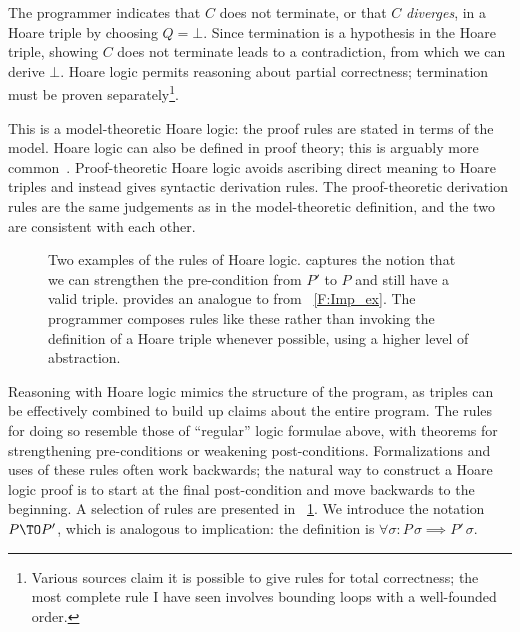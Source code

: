 The programmer indicates that \(C\) does not terminate, or that \(C\)
\emph{diverges}, in a Hoare triple by choosing \(Q = \bot\). Since termination
is a hypothesis in the Hoare triple, showing \(C\) does not terminate leads to a
contradiction, from which we can derive \(\bot\). Hoare logic permits reasoning
about partial correctness; termination must be proven
separately\footnote{Various sources claim it is possible to give rules for total
correctness; the most complete rule I have seen involves bounding loops with a
well-founded order.}.

This is a model-theoretic Hoare logic: the proof rules are stated in terms of
the model. Hoare logic can also be defined in proof theory; this is arguably
more common~\cite[Ch.\ \emph{Hoare Logic as a Logic}]{Pierce:SF2}.
Proof-theoretic Hoare logic avoids ascribing direct meaning to Hoare triples and
instead gives syntactic derivation rules. The proof-theoretic derivation rules
are the same judgements as in the model-theoretic definition, and the two are
consistent with each other.

\begin{figure}[ht]
    \centering
    \caption{Two examples of the rules of Hoare logic.
     captures the notion that we can strengthen the
    pre-condition from \(P'\) to \(P\) and still have a valid triple.
     provides an analogue to  from
    \figurename~\ref{F:Imp_ex}. The programmer composes rules like these rather
    than invoking the definition of a Hoare triple whenever possible, using a
    higher level of abstraction.}\label{F:Hoare_ex}
\end{figure}

Reasoning with Hoare logic mimics the structure of the program, as triples can
be effectively combined to build up claims about the entire program. The rules
for doing so resemble those of ``regular'' logic formulae above, with theorems
for strengthening pre-conditions or weakening post-conditions. Formalizations
and uses of these rules often work backwards; the natural way to construct a
Hoare logic proof is to start at the final post-condition and move backwards to
the beginning. A selection of rules are presented in
\figurename~\ref{F:Hoare_ex}. We introduce the notation \(P \TO P'\), which is
analogous to implication: the definition is \(\forall \sigma: P\, \sigma
\implies P'\, \sigma\).

